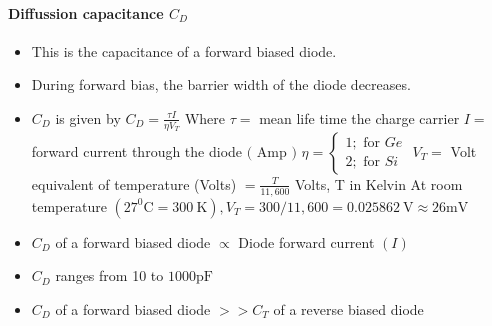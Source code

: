 \paragraph{Diffussion capacitance $C_D$}
\begin{itemize}
\item This is the capacitance of a forward biased diode.
\item During forward bias, the barrier width of the diode decreases.
\item $C_{D}$ is given by $C_{D}=\frac{\tau I}{\eta V_{T}}$
Where $\tau=$ mean life time the charge carrier
$I=$ forward current through the diode $($ Amp $)$
$\eta=\left\{\begin{array}{l}1 ; \text { for } G e \\ 2 ; \text { for } S i\end{array}\right.$
$V_{T}=$ Volt equivalent of temperature (Volts) $=\frac{T}{11,600}$ Volts, T in Kelvin
At room temperature $\left(27^{0} \mathrm{C}=300 \mathrm{~K}\right), V_{T}=300 / 11,600=0.025862 \mathrm{~V} \approx 26 \mathrm{mV}$
\item  $C_{D}$ of a forward biased diode $\propto$ Diode forward current $(I)$
\item  $C_{D}$ ranges from 10 to $1000 \mathrm{pF}$
\item $C_{D}$ of a forward biased diode $>>C_{T}$ of a reverse biased diode
\end{itemize}
